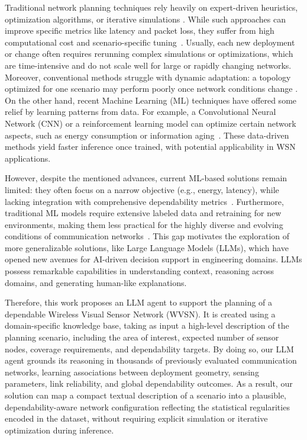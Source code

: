 Traditional network planning techniques rely heavily on expert-driven heuristics, optimization algorithms, or iterative simulations \cite{surveyHeuristics}. While such approaches can improve specific metrics like latency and packet loss, they suffer from high computational cost and scenario-specific tuning~\cite{surveySwarm}. Usually, each new deployment or change often requires rerunning complex simulations or optimizations, which are time-intensive and do not scale well for large or rapidly changing networks. Moreover, conventional methods struggle with dynamic adaptation: a topology optimized for one scenario may perform poorly once network conditions change \cite{surveyAdaptive}. On the other hand, recent Machine Learning (ML) techniques have offered some relief by learning patterns from data. For example, a Convolutional Neural Network (CNN) or a reinforcement learning model can optimize certain network aspects, such as energy consumption or information aging~\cite{surveyML1}. These data-driven methods yield faster inference once trained, with potential applicability in WSN applications. 

However, despite the mentioned advances, current ML-based solutions remain limited: they often focus on a narrow objective (e.g., energy, latency), while lacking integration with comprehensive dependability metrics~\cite{surveyML2}. Furthermore, traditional ML models require extensive labeled data and retraining for new environments, making them less practical for the highly diverse and evolving conditions of communication networks~\cite{DepML2025}. This gap motivates the exploration of more generalizable solutions, like Large Language Models (LLMs), which have opened new avenues for AI-driven decision support in engineering domains. LLMs possess remarkable capabilities in understanding context, reasoning across domains, and generating human-like explanations. 

Therefore, this work proposes an LLM agent to support the planning of a dependable  Wireless Visual Sensor Network (WVSN). It is created using a domain-specific knowledge base, taking as input a high-level description of the planning scenario, including the area of interest, expected number of sensor nodes, coverage requirements, and dependability targets. By doing so, our LLM agent grounds its reasoning in thousands of previously evaluated communication networks, learning associations between deployment geometry, sensing parameters, link reliability, and global dependability outcomes. As a result, our solution can map a compact textual description of a scenario into a plausible, dependability-aware network configuration reflecting the statistical regularities encoded in the dataset, without requiring explicit simulation or iterative optimization during inference.

